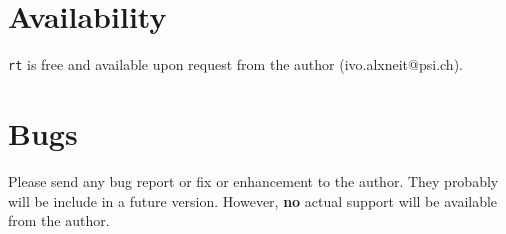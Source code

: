 \documentclass[10pt,a4paper,titlepage]{article}
\newcommand{\rt}{{\tt rt} }
\begin{document}
\section{Availability}
\rt is free and available upon request from the author (ivo.alxneit@psi.ch).



\section{Bugs} Please send any bug report or fix or enhancement to the author. They probably will be include in a future version. However, {\bf no} actual support will be available from the author.
\end{document}
